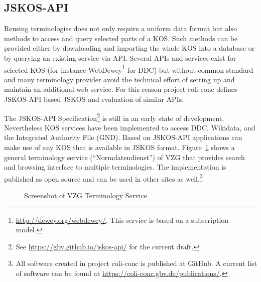 \documentclass[12pt,a4paper]{llncs}
\begin{document}
\subsection{JSKOS-API}
Reusing terminologies does not only require a uniform data format but also methods to access and query selected parts of a KOS. Such methods can be provided either by downloading and importing the whole KOS into a database or by querying an existing service via API. Several APIs and services exist for selected KOS (for instance WebDewey\footnote{\url{http://dewey.org/webdewey/}. This service is based on a subscription model.} for DDC) but without common standard and many terminology provider avoid the technical effort of setting up and maintain an additional web service. For this reason project coli-conc defines JSKOS-API based JSKOS and evaluation of similar APIs.

The JSKOS-API Specification\footnote{See \href{https://gbv.github.io/jskos-api/}{https://gbv.github.io/jskos-api/} for the current draft.} is still in an early state of development. Nevertheless KOS services have been implemented to access DDC, Wikidata, and the Integrated Authority File (GND). 
Based on JSKOS-API applications can make use of any KOS that is available in JSKOS format. Figure~\ref{fig:normdatenservice} shows a general terminology service (``Normdatendienst'') of VZG that provides search and browsing interface to multiple terminologies.
The implementation is published as open source and can be used in other sites as well.\footnote{All software created in project coli-conc is published at GitHub. A current list of software can be found at \href{https://coli-conc.gbv.de/publications/}{https://coli-conc.gbv.de/publications/}.}


\begin{figure}
\centering
{}
\caption{Screenshot of VZG Terminology Service}
\label{fig:normdatenservice}
\end{figure}
\end{document}
